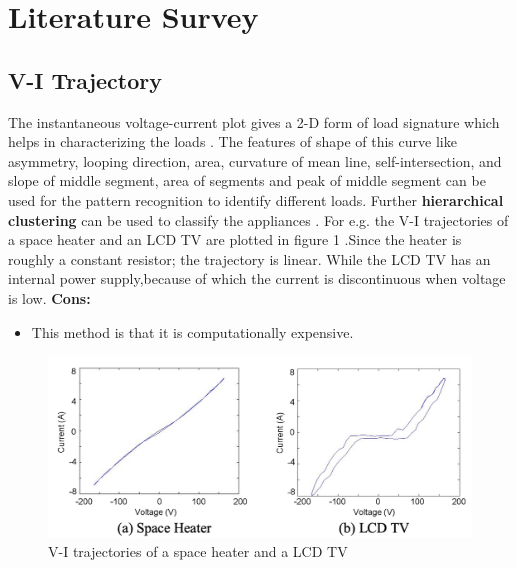 \documentclass[11pt, a4paper]{article} %
\begin{document}
\section{Literature Survey}
\subsection{V-I Trajectory}
The instantaneous voltage-current plot gives a 2-D form of load signature which helps in characterizing the loads \cite{192069}. The features of shape of this curve like asymmetry, looping direction, area, curvature of mean line, self-intersection, and slope of middle segment, area of segments and peak of middle segment can be used for the pattern recognition to identify different loads. Further \textbf{hierarchical clustering} can be used to classify the appliances \cite{4266955}. 
For e.g. the V-I trajectories of a space heater and an LCD TV are plotted in figure 1 \cite{5618423}.Since the heater is roughly a constant resistor; the trajectory is linear. While the LCD TV has an internal power supply,because of which the current is discontinuous when voltage is low.
\newline
\textbf{Cons:}
\newline 
\begin{itemize}
    \item This method is that it is computationally expensive.
\end{itemize}


\begin{figure}[htpb!] %
    \centering %
    \includegraphics[scale=0.6]{figure/ivfig.png} %
    \caption{V-I trajectories of a space heater and a LCD TV \cite{5618423}} %
    \label{fig:my_label} %
\end{figure}
\end{document}
